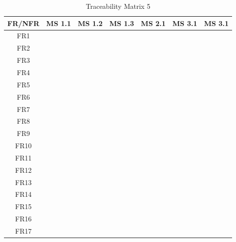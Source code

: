 \documentclass{article}
\begin{document}
\begin{table}[H]
\centering
\begin{tabular}{|c|c|c|c|c|c|c|}
\hline
FR/NFR & MS 1.1 & MS 1.2 & MS 1.3 & MS 2.1 & MS 3.1 & MS 3.1 \\ \hline
FR1    &        &        &        &        &        &        \\ \hline
FR2    &        &        &        &        &        &        \\ \hline
FR3    &        &        &        &        &        &        \\ \hline
FR4    &        &        &        &        &        &        \\ \hline
FR5    &        &        &        &        &        &        \\ \hline
FR6    &        &        &        &        &        &        \\ \hline
FR7    &        &        &        &        &        &        \\ \hline
FR8    &        &        &        &        &        &        \\ \hline
FR9    &        &        &        &        &        &        \\ \hline
FR10   &        &        &        &        &        &        \\ \hline
FR11   &        &        &        &        &        &        \\ \hline
FR12   &        &        &        &        &        &        \\ \hline
FR13   &        &        &        &        &        &        \\ \hline
FR14   &        &        &        &        &        &        \\ \hline
FR15   &        &        &        &        &        &        \\ \hline
FR16   &        &        &        &        &        &        \\ \hline
FR17   &        &        &        &        &        &        \\ \hline
\end{tabular}
\caption{Traceability Matrix 5}
\end{table}

\newpage
\end{document}
